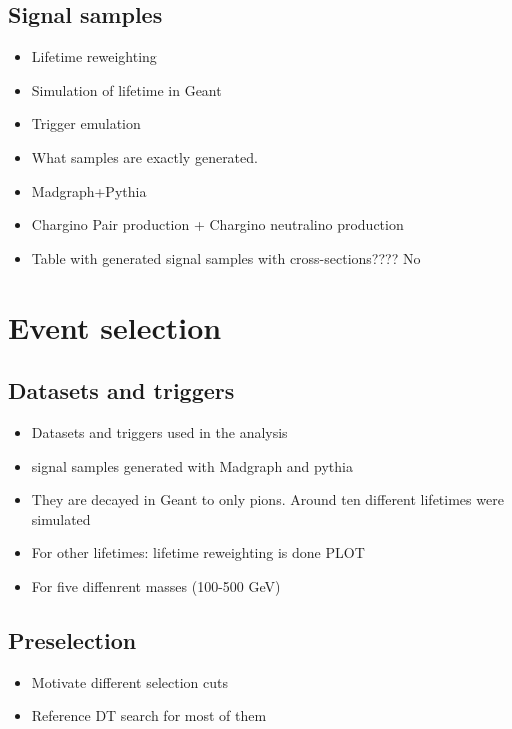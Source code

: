 \subsection{Signal samples}
\label{sec:SignalSamples}
\begin{itemize}
\item Lifetime reweighting
\item Simulation of lifetime in Geant
\item Trigger emulation
\item What samples are exactly generated.
\item Madgraph+Pythia
\item Chargino Pair production + Chargino neutralino production
\item Table with generated signal samples with cross-sections???? No
\end{itemize}

\section{Event selection}
\label{sec:EventSelection}
\subsection{Datasets and triggers}
\begin{itemize}
\item Datasets and triggers used in the analysis
\item signal samples generated with Madgraph and pythia
\item They are decayed in Geant to only pions. Around ten different lifetimes were simulated
\item For other lifetimes: lifetime reweighting is done PLOT
\item For five diffenrent masses (100-500 GeV) 
\end{itemize}
\subsection{Preselection}
\begin{itemize}
\item Motivate different selection cuts
\item Reference DT search for most of them
\end{itemize}
